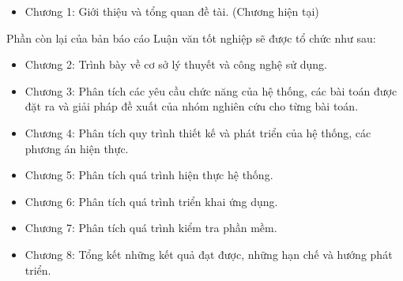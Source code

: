 \begin{itemize}
  \item Chương 1: Giới thiệu và tổng quan đề tài. (Chương hiện tại)
\end{itemize}
Phần còn lại của bản báo cáo Luận văn tốt nghiệp sẽ được tổ chức như sau:
\begin{itemize}
  \item Chương 2: Trình bày về cơ sở lý thuyết và công nghệ sử dụng.
  \item Chương 3: Phân tích các yêu cầu chức năng của hệ thống, các bài toán được đặt ra và giải pháp đề xuất của nhóm nghiên cứu cho từng bài toán.
  \item Chương 4: Phân tích quy trình thiết kế và phát triển của hệ thống, các phương án hiện thực.
  \item Chương 5: Phân tích quá trình hiện thực hệ thống.
  \item Chương 6: Phân tích quá trình triển khai ứng dụng.
  \item Chương 7: Phân tích quá trình kiểm tra phần mềm.
  \item Chương 8: Tổng kết những kết quả đạt được, những hạn chế và hướng phát triển.
\end{itemize}